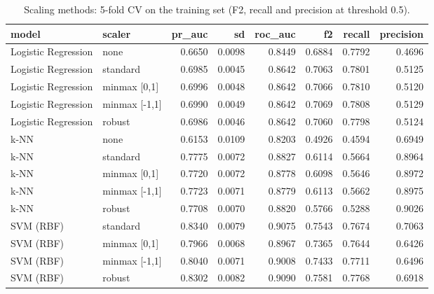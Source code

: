 \begin{table}[H]
\centering
\scriptsize
\begin{adjustbox}{max width=\linewidth}
\begin{tabular}{llrrrrrr}
\toprule
model & scaler & pr\_auc & sd & roc\_auc & f2 & recall & precision \\
\midrule
Logistic Regression & none & 0.6650 & 0.0098 & 0.8449 & 0.6884 & 0.7792 & 0.4696 \\
Logistic Regression & standard & 0.6985 & 0.0045 & 0.8642 & 0.7063 & 0.7801 & 0.5125 \\
Logistic Regression & minmax [0,1] & 0.6996 & 0.0048 & 0.8642 & 0.7066 & 0.7810 & 0.5120 \\
Logistic Regression & minmax [-1,1] & 0.6990 & 0.0049 & 0.8642 & 0.7069 & 0.7808 & 0.5129 \\
Logistic Regression & robust & 0.6986 & 0.0046 & 0.8642 & 0.7060 & 0.7798 & 0.5124 \\
k-NN & none & 0.6153 & 0.0109 & 0.8203 & 0.4926 & 0.4594 & 0.6949 \\
k-NN & standard & 0.7775 & 0.0072 & 0.8827 & 0.6114 & 0.5664 & 0.8964 \\
k-NN & minmax [0,1] & 0.7720 & 0.0072 & 0.8778 & 0.6098 & 0.5646 & 0.8972 \\
k-NN & minmax [-1,1] & 0.7723 & 0.0071 & 0.8779 & 0.6113 & 0.5662 & 0.8975 \\
k-NN & robust & 0.7708 & 0.0070 & 0.8820 & 0.5766 & 0.5288 & 0.9026 \\
SVM (RBF) & standard & 0.8340 & 0.0079 & 0.9075 & 0.7543 & 0.7674 & 0.7063 \\
SVM (RBF) & minmax [0,1] & 0.7966 & 0.0068 & 0.8967 & 0.7365 & 0.7644 & 0.6426 \\
SVM (RBF) & minmax [-1,1] & 0.8040 & 0.0071 & 0.9008 & 0.7433 & 0.7711 & 0.6496 \\
SVM (RBF) & robust & 0.8302 & 0.0082 & 0.9090 & 0.7581 & 0.7768 & 0.6918 \\
\bottomrule
\end{tabular}
\end{adjustbox}
\caption{Scaling methods: 5-fold CV on the training set (F2, recall and precision at threshold 0.5).}
\label{tab:suite_scaling}
\end{table}
